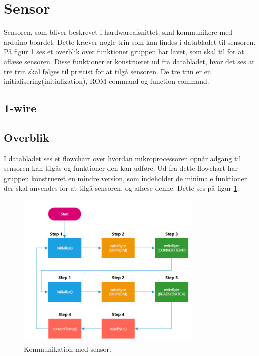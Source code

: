 \section{Sensor}
Sensoren, som bliver beskrevet i hardwareafsnittet, skal kommunikere med arduino boardet. Dette kræver nogle trin som kan findes i databladet til sensoren. På figur \ref{sensor_kom} ses et overblik over funktioner gruppen har lavet, som skal til for at aflæse sensoren. Disse funktioner er konstrueret ud fra databladet, hvor det ses at tre trin skal følges til præcist for at tilgå sensoren. De tre trin er en initialisering(initialization), ROM command og function command.
\subsection{1-wire}


\subsection{Overblik}
I databladet ses et flowchart over hvordan mikroprocessoren opnår adgang til sensoren kan tilgås og funktioner den kan udføre. Ud fra dette flowchart har gruppen konstrueret en mindre version, som indeholder de minimale funktioner der skal anvendes for at tilgå sensoren, og aflæse denne. Dette ses på figur \ref{sensor_kom}.

\begin{figure}[h!]
  \centering
  \includegraphics[width=0.8\textwidth]{figures/sensor_communication.png}
  \caption{Kommunikation med sensor.}
  \label{sensor_kom}
\end{figure}

